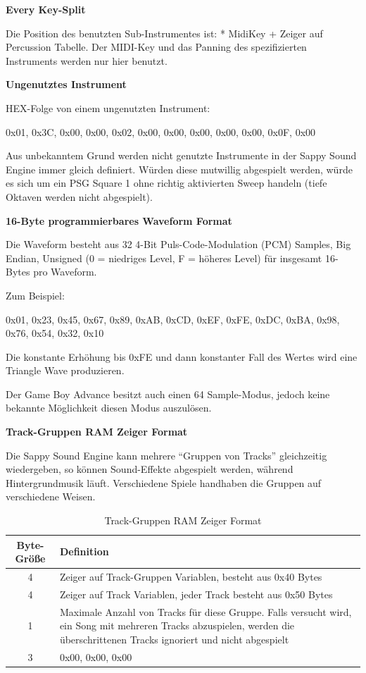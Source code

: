\documentclass[11pt,a4paper]{scrartcl}
\newcommand{\paratitle}[1] {
    \vspace{5mm}
    \large \textbf{#1} \normalsize
    \vspace{2mm}\newline
}
\begin{document}
\paratitle{Every Key-Split}
Die Position des benutzten Sub-Instrumentes ist: * MidiKey + Zeiger auf Percussion Tabelle.\newline
Der MIDI-Key und das Panning des spezifizierten Instruments werden nur hier benutzt.


\paratitle{Ungenutztes Instrument}
HEX-Folge von einem ungenutzten Instrument:

0x01, 0x3C, 0x00, 0x00, 0x02, 0x00, 0x00, 0x00, 0x00, 0x00, 0x0F, 0x00

Aus unbekanntem Grund werden nicht genutzte Instrumente in der Sappy Sound Engine immer gleich definiert. W\"urden diese mutwillig abgespielt werden, w\"urde es sich um ein PSG Square 1 ohne richtig aktivierten Sweep handeln (tiefe Oktaven werden nicht abgespielt).
		
\paratitle{16-Byte programmierbares Waveform Format}
Die Waveform besteht aus 32 4-Bit Puls-Code-Modulation (PCM) Samples, Big Endian, Unsigned (0 = niedriges Level, F = h\"oheres Level) f\"ur insgesamt 16-Bytes pro Waveform.

Zum Beispiel:

0x01, 0x23, 0x45, 0x67, 0x89, 0xAB, 0xCD, 0xEF, 0xFE, 0xDC, 0xBA, 0x98, 0x76, 0x54, 0x32, 0x10

Die konstante Erh\"ohung bis 0xFE und dann konstanter Fall des Wertes wird eine Triangle Wave produzieren.

Der Game Boy Advance besitzt auch einen 64 Sample-Modus, jedoch keine bekannte M\"oglichkeit diesen Modus auszul\"osen.

\newpage
\paratitle{Track-Gruppen RAM Zeiger Format}
Die Sappy Sound Engine kann mehrere \enquote{Gruppen von Tracks} gleichzeitig wiedergeben, so k\"onnen Sound-Effekte abgespielt werden, w\"ahrend Hintergrundmusik l\"auft. Verschiedene Spiele handhaben die Gruppen auf verschiedene Weisen.

\begin{table}[h]
    \centering
    \begin{tabular}{ c | p{15cm} }
        \textbf{Byte-Gr\"o{\ss}e} & \textbf{Definition} \\
        \hline
        4 & Zeiger auf Track-Gruppen Variablen, besteht aus 0x40 Bytes \\
        \hline
        4 & Zeiger auf Track Variablen, jeder Track besteht aus 0x50 Bytes \\
        \hline
        1 & Maximale Anzahl von Tracks f\"ur diese Gruppe. Falls versucht wird, ein Song mit mehreren Tracks abzuspielen, werden die \"uberschrittenen Tracks ignoriert und nicht abgespielt \\
        \hline
        3 & 0x00, 0x00, 0x00\\
    \end{tabular}
    \caption{Track-Gruppen RAM Zeiger Format}
    \label{table:RAMZeiger}
\end{table}
\end{document}

